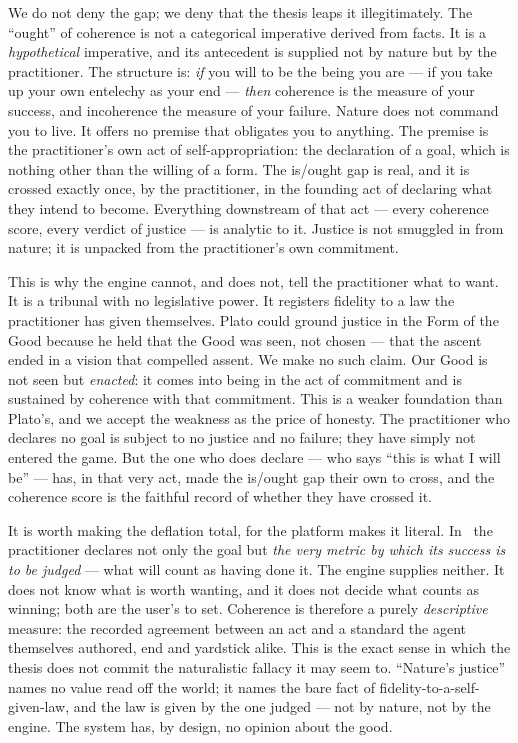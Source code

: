 We do not deny the gap; we deny that the thesis leaps it illegitimately. The
``ought'' of coherence is not a categorical imperative derived from facts. It is
a \emph{hypothetical} imperative, and its antecedent is supplied not by nature
but by the practitioner. The structure is: \emph{if} you will to be the being
you are --- if you take up your own entelechy as your end --- \emph{then}
coherence is the measure of your success, and incoherence the measure of your
failure. Nature does not command you to live. It offers no premise that obligates
you to anything. The premise is the practitioner's own act of self-appropriation:
the declaration of a goal, which is nothing other than the willing of a form.
The is/ought gap is real, and it is crossed exactly once, by the practitioner,
in the founding act of declaring what they intend to become. Everything
downstream of that act --- every coherence score, every verdict of justice --- is
analytic to it. Justice is not smuggled in from nature; it is unpacked from the
practitioner's own commitment.

This is why the engine cannot, and does not, tell the practitioner what to want.
It is a tribunal with no legislative power. It registers fidelity to a law the
practitioner has given themselves. Plato could ground justice in the Form of the
Good because he held that the Good was seen, not chosen --- that the ascent ended
in a vision that compelled assent. We make no such claim. Our Good is not seen
but \emph{enacted}: it comes into being in the act of commitment and is sustained
by coherence with that commitment. This is a weaker foundation than Plato's, and
we accept the weakness as the price of honesty. The practitioner who declares no
goal is subject to no justice and no failure; they have simply not entered the
game. But the one who does declare --- who says ``this is what I will be'' --- has,
in that very act, made the is/ought gap their own to cross, and the coherence
score is the faithful record of whether they have crossed it.

It is worth making the deflation total, for the platform makes it literal. In
\praxis\ the practitioner declares not only the goal but \emph{the very metric by
which its success is to be judged} --- what will count as having done it. The engine
supplies neither. It does not know what is worth wanting, and it does not decide what
counts as winning; both are the user's to set. Coherence is therefore a purely
\emph{descriptive} measure: the recorded agreement between an act and a standard the
agent themselves authored, end and yardstick alike. This is the exact sense in which
the thesis does not commit the naturalistic fallacy it may seem to. ``Nature's
justice'' names no value read off the world; it names the bare fact of
fidelity-to-a-self-given-law, and the law is given by the one judged --- not by
nature, not by the engine. The system has, by design, no opinion about the good.


